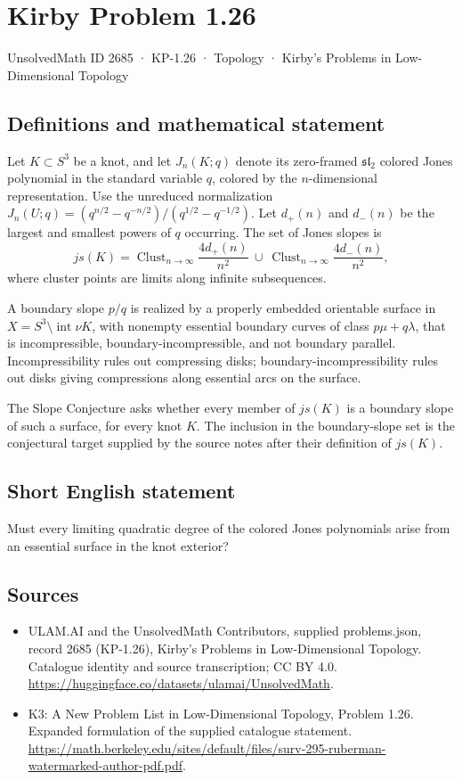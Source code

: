 \documentclass[11pt,a4paper]{article}
\begin{document}
\section*{Kirby Problem 1.26}\label{2685}
{\small UnsolvedMath ID 2685 · KP-1.26 · Topology · Kirby's Problems in Low-Dimensional Topology}
\subsection{Definitions and mathematical statement}
Let $K\subset S^3$ be a knot, and let $J_n(K;q)$ denote its zero-framed
$\mathfrak{sl}_2$ colored Jones polynomial in the standard variable $q$, colored
by the $n$-dimensional representation. Use the unreduced normalization
$J_n(U;q)=(q^{n/2}-q^{-n/2})/(q^{1/2}-q^{-1/2})$.
Let $d_+(n)$ and $d_-(n)$ be the largest and smallest powers of $q$ occurring.
The set of Jones slopes is
\[
js(K)=\operatorname{Clust}_{n\to\infty}\frac{4d_+(n)}{n^2}
\ \cup\ \operatorname{Clust}_{n\to\infty}\frac{4d_-(n)}{n^2},
\]
where cluster points are limits along infinite subsequences.

A boundary slope $p/q$ is realized by a properly embedded orientable surface
in $X=S^3\setminus\operatorname{int}\nu K$, with nonempty essential boundary
curves of class $p\mu+q\lambda$, that is incompressible, boundary-incompressible,
and not boundary parallel. Incompressibility rules out compressing disks;
boundary-incompressibility rules out disks giving compressions along essential
arcs on the surface.

The Slope Conjecture asks whether every member of $js(K)$ is a boundary slope
of such a surface, for every knot $K$. The inclusion in the boundary-slope set
is the conjectural target supplied by the source notes after their definition
of $js(K)$.
\subsection{Short English statement}
Must every limiting quadratic degree of the colored Jones polynomials arise from an essential surface in the knot exterior?
\subsection{Sources}
\begin{itemize}
\item[S1] ULAM.AI and the UnsolvedMath Contributors, supplied problems.json, record 2685 (KP-1.26), Kirby's Problems in Low-Dimensional Topology. Catalogue identity and source transcription; CC BY 4.0.
\url{https://huggingface.co/datasets/ulamai/UnsolvedMath}.
\item[S2] K3: A New Problem List in Low-Dimensional Topology, Problem 1.26. Expanded formulation of the supplied catalogue statement.
\url{https://math.berkeley.edu/sites/default/files/surv-295-ruberman-watermarked-author-pdf.pdf}.
\end{itemize}
\end{document}
